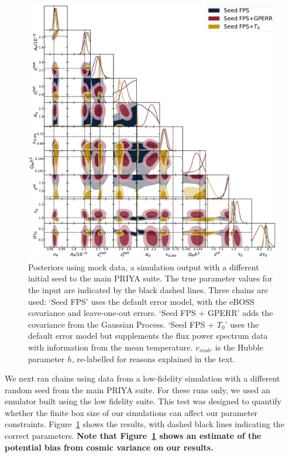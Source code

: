 \begin{figure}
    \centering
    \includegraphics[width=\textwidth]{figures/simdat-seed.pdf}
    \caption{\label{fig:simdat_posteriors}
    Posteriors using mock data, a simulation output with a different initial seed to the main PRIYA suite.
    The true parameter values for the input are indicated by the black dashed lines.
    Three chains are used: `Seed FPS' uses the default error model, with the eBOSS covariance and leave-one-out errors.
    `Seed FPS + GPERR' adds the covariance from the Gaussian Process.
    `Seed FPS + $T_0$' uses the default error model but supplements the flux power spectrum data with information from the mean temperature.
    $v_{scale}$ is the Hubble parameter $h$, re-labelled for reasons explained in the text.}
\end{figure}

We next ran chains using data from a low-fidelity simulation with a different random seed from the main PRIYA suite.
For these runs only, we used an emulator built using the low fidelity suite.
This test was designed to quantify whether the finite box size of our simulations can affect our parameter constraints.
Figure~\ref{fig:simdat_posteriors} shows the results, with dashed black lines indicating the correct parameters. \textbf{Note that Figure~\ref{fig:simdat_posteriors} shows an estimate of the potential bias from cosmic variance on our results.}

